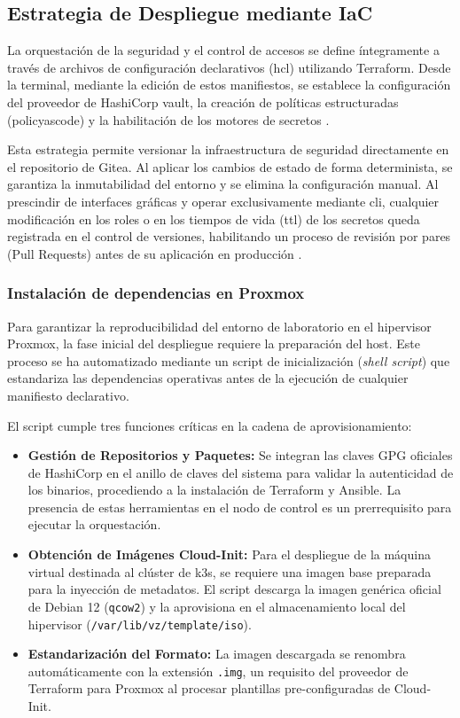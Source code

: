 \documentclass[runningheads]{llncs}
\begin{document}
\subsection{Estrategia de Despliegue mediante IaC}
La orquestación de la seguridad y el control de accesos se define íntegramente a través de archivos de configuración declarativos (\gls{hcl}) utilizando Terraform. Desde la terminal, mediante la edición de estos manifiestos, se establece la configuración del proveedor de HashiCorp \gls{vault}, la creación de políticas estructuradas (\gls{policyascode}) y la habilitación de los motores de secretos \parencite{terraform_documentation}.

Esta estrategia permite versionar la infraestructura de seguridad directamente en el repositorio de Gitea. Al aplicar los cambios de estado de forma determinista, se garantiza la inmutabilidad del entorno y se elimina la configuración manual.  Al prescindir de interfaces gráficas y operar exclusivamente mediante \gls{cli}, cualquier modificación en los roles o en los tiempos de vida (\gls{ttl}) de los secretos queda registrada en el control de versiones, habilitando un proceso de revisión por pares (Pull Requests) antes de su aplicación en producción \parencite{terraform_documentation}.

\subsubsection{Instalación de dependencias en Proxmox}
Para garantizar la reproducibilidad del entorno de laboratorio en el hipervisor Proxmox, la fase inicial del despliegue requiere la preparación del host. Este proceso se ha automatizado mediante un script de inicialización (\textit{shell script}) que estandariza las dependencias operativas antes de la ejecución de cualquier manifiesto declarativo.

El script cumple tres funciones críticas en la cadena de aprovisionamiento:

\begin{itemize}
    \item \textbf{Gestión de Repositorios y Paquetes:} Se integran las claves GPG oficiales de HashiCorp en el anillo de claves del sistema para validar la autenticidad de los binarios, procediendo a la instalación de Terraform y Ansible. La presencia de estas herramientas en el nodo de control es un prerrequisito para ejecutar la orquestación.
    \item \textbf{Obtención de Imágenes Cloud-Init:} Para el despliegue de la máquina virtual destinada al clúster de \gls{k3s}, se requiere una imagen base preparada para la inyección de metadatos. El script descarga la imagen genérica oficial de Debian 12 (\texttt{qcow2}) y la aprovisiona en el almacenamiento local del hipervisor (\texttt{/var/lib/vz/template/iso}).
    \item \textbf{Estandarización del Formato:} La imagen descargada se renombra automáticamente con la extensión \texttt{.img}, un requisito del proveedor de Terraform para Proxmox al procesar plantillas pre-configuradas de Cloud-Init.
\end{itemize}
\end{document}
